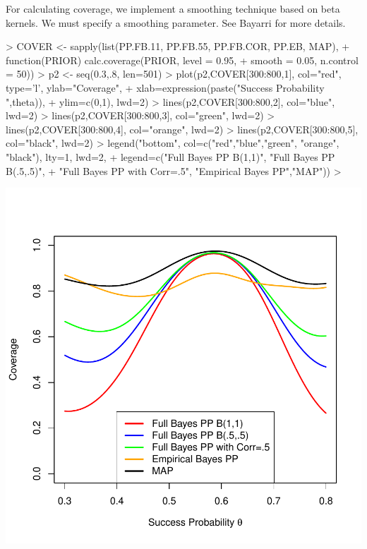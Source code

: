 \documentclass{article}
\begin{document}
For calculating coverage, we implement a smoothing technique based on beta kernels. We must specify a smoothing parameter. See Bayarri for more details. 
\begin{Schunk}
\begin{Sinput}
> COVER <- sapply(list(PP.FB.11, PP.FB.55, PP.FB.COR, PP.EB, MAP), 
+                   function(PRIOR) calc.coverage(PRIOR, level = 0.95, 
+                                                 smooth = 0.05, n.control = 50))
> p2 <- seq(0.3,.8, len=501)
> plot(p2,COVER[300:800,1],  col="red", type='l', ylab="Coverage",
+      xlab=expression(paste("Success Probability ",theta)),
+      ylim=c(0,1), lwd=2)
> lines(p2,COVER[300:800,2],  col="blue", lwd=2)
> lines(p2,COVER[300:800,3],  col="green", lwd=2)
> lines(p2,COVER[300:800,4],  col="orange", lwd=2)
> lines(p2,COVER[300:800,5],  col="black", lwd=2)
> legend("bottom", col=c("red","blue","green", "orange", "black"), lty=1, lwd=2,
+        legend=c("Full Bayes PP B(1,1)", "Full Bayes PP B(.5,.5)",
+                 "Full Bayes PP with Corr=.5", "Empirical Bayes PP","MAP"))
> 
\end{Sinput}
\end{Schunk}
\includegraphics{Binomial-cover}
\end{document}
